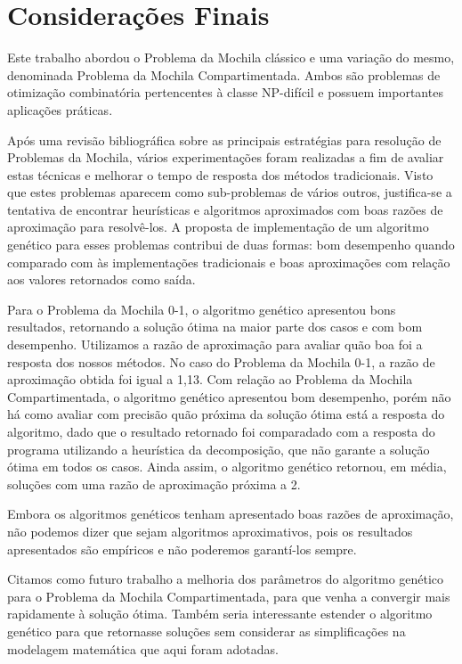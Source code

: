 \pagestyle{plain}

\chapter{Considerações Finais} \label{sec:conclusao}

Este trabalho abordou o Problema da Mochila clássico e uma variação do mesmo, denominada Problema da Mochila Compartimentada. Ambos são problemas de otimização combinatória pertencentes à classe NP-difícil e possuem importantes aplicações práticas.

Após uma revisão bibliográfica sobre as principais estratégias para resolução de Problemas da Mochila, vários experimentações foram realizadas a fim de avaliar estas técnicas e melhorar o tempo de resposta dos métodos tradicionais. Visto que estes problemas aparecem como sub-problemas de vários outros, justifica-se a tentativa de encontrar heurísticas e algoritmos aproximados com boas razões de aproximação para resolvê-los. A proposta de implementação de um algoritmo genético para esses problemas contribui de duas formas: bom desempenho quando comparado com às implementações tradicionais e boas aproximações com relação aos valores retornados como saída.

Para o Problema da Mochila 0-1, o algoritmo genético apresentou bons resultados, retornando a solução ótima na maior parte dos casos e com bom desempenho. Utilizamos a razão de aproximação para avaliar quão boa foi a resposta dos nossos métodos. No caso do Problema da Mochila 0-1, a razão de aproximação obtida foi igual a 1,13. Com relação ao Problema da Mochila Compartimentada, o algoritmo genético apresentou bom desempenho, porém não há como avaliar com precisão quão próxima da solução ótima está a resposta do algoritmo, dado que o resultado retornado foi comparadado com a resposta do programa utilizando a heurística da decomposição, que não garante a solução ótima em todos os casos. Ainda assim, o algoritmo genético  retornou, em média, soluções com uma razão de aproximação próxima a 2.

Embora os algoritmos genéticos tenham apresentado boas razões de aproximação, não podemos dizer que sejam algoritmos aproximativos, pois os resultados apresentados são empíricos e não poderemos garantí-los sempre. 

Citamos como futuro trabalho a melhoria dos parâmetros do algoritmo genético para o Problema da Mochila Compartimentada, para que venha a convergir mais rapidamente à solução ótima. Também seria interessante estender o algoritmo genético para que retornasse soluções sem considerar as simplificações na modelagem matemática que aqui foram adotadas.

